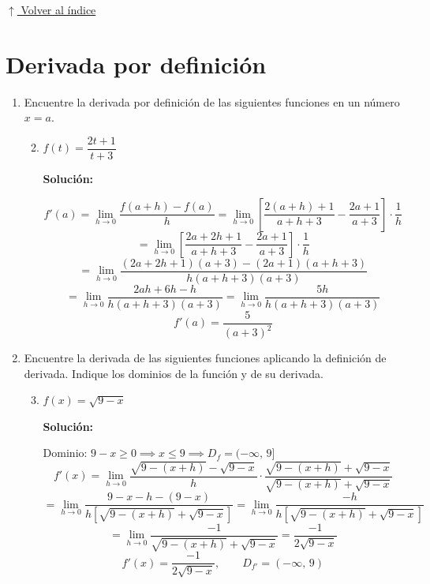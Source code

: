 \documentclass[12pt]{article}
\newcommand{\solucion}{%
    \vspace{0.8em}%
    \textbf{Solución:}%
}
\newcommand{\volverindice}{%
    \vspace{1em}%
    \begin{flushright}%
        \hyperlink{indice}{\small $\uparrow$ Volver al índice}%
    \end{flushright}%
}
\begin{document}
\volverindice
\newpage

\section{Derivada por definición}

\begin{enumerate}[label=\alph*.-]
    \item Encuentre la derivada por definición de las siguientes funciones en un número $x = a$.

    \begin{enumerate}[label=\roman*.-]
        \setcounter{enumii}{1} %
        \item $f(t) = \dfrac{2t+1}{t+3}$

        \solucion
        \[
        f'(a) = \lim_{h \to 0} \frac{f(a+h) - f(a)}{h}
        = \lim_{h \to 0} \left[\frac{2(a+h)+1}{a+h+3} - \frac{2a+1}{a+3}\right] \cdot \frac{1}{h}
        \]
        \[
        = \lim_{h \to 0} \left[\frac{2a+2h+1}{a+h+3} - \frac{2a+1}{a+3}\right] \cdot \frac{1}{h}
        \]
        \[
        = \lim_{h \to 0} \frac{(2a+2h+1)(a+3) - (2a+1)(a+h+3)}{h(a+h+3)(a+3)}
        \]
        \[
        = \lim_{h \to 0} \frac{2ah + 6h - h}{h(a+h+3)(a+3)}
        = \lim_{h \to 0} \frac{5h}{h(a+h+3)(a+3)}
        \]
        \[
        \boxed{f'(a) = \frac{5}{(a+3)^2}}
        \]
    \end{enumerate}

    \item Encuentre la derivada de las siguientes funciones aplicando la definición de derivada. Indique los dominios de la función y de su derivada.

    \begin{enumerate}[label=\roman*.-]
        \setcounter{enumii}{2} %
        \item $f(x) = \sqrt{9-x}$

        \solucion

        $\text {Dominio: } 9 - x \geq 0 \implies x \leq 9 \implies D_f = (-\infty,\, 9]$
        \[
        f'(x) = \lim_{h \to 0} \frac{\sqrt{9-(x+h)} - \sqrt{9-x}}{h}
        \cdot \frac{\sqrt{9-(x+h)} + \sqrt{9-x}}{\sqrt{9-(x+h)} + \sqrt{9-x}}
        \]
        \[
        = \lim_{h \to 0} \frac{9-x-h - (9-x)}{h\left[\sqrt{9-(x+h)} + \sqrt{9-x}\right]}
        = \lim_{h \to 0} \frac{-h}{h\left[\sqrt{9-(x+h)} + \sqrt{9-x}\right]}
        \]
        \[
        = \lim_{h \to 0} \frac{-1}{\sqrt{9-(x+h)} + \sqrt{9-x}}
        = \frac{-1}{2\sqrt{9-x}}
        \]
        \[
        \boxed{f'(x) = \frac{-1}{2\sqrt{9-x}}, \qquad D_{f'} = (-\infty,\, 9)}
        \]
    \end{enumerate}

\end{enumerate}
\end{document}
